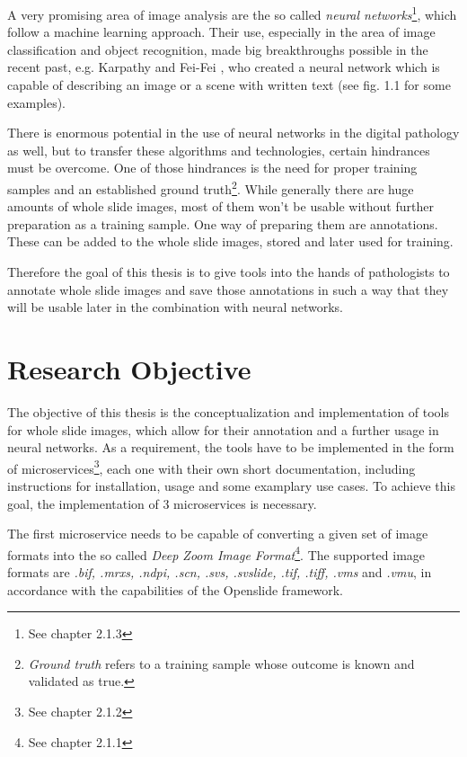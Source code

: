 A very promising area of image analysis are the so called \emph{neural networks}\footnote{See chapter 2.1.3}, which follow a machine learning approach. Their use, especially in the area of image classification and object recognition, made big breakthroughs possible in the recent past, e.g. Karpathy and Fei-Fei \cite{Karpathy15}, who created a neural network which is capable of describing an image or a scene with written text (see fig. 1.1 for some examples).

There is enormous potential in the use of neural networks in the digital pathology as well, but to transfer these algorithms and technologies, certain hindrances must be overcome. One of those hindrances is the need for proper training samples and an established ground truth\footnote{\emph{Ground truth} refers to a training sample whose outcome is known and validated as true.}. While generally there are huge amounts of whole slide images, most of them won't be usable without further preparation as a training sample. One way of preparing them are annotations. These can be added to the whole slide images, stored and later used for training.

Therefore the goal of this thesis is to give tools into the hands of pathologists to annotate whole slide images and save those annotations in such a way that they will be usable later in the combination with neural networks.


\section{Research Objective}

The objective of this thesis is the conceptualization and implementation of tools for whole slide images, which allow for their annotation and a further usage in neural networks.
As a requirement, the tools have to be implemented in the form of microservices\footnote{See chapter 2.1.2}, each one with their own short documentation, including instructions for installation, usage and some examplary use cases. To achieve this goal, the implementation of 3 microservices is necessary.

The first microservice needs to be capable of converting a given set of image formats into the so called \emph{Deep Zoom Image Format}\footnote{See chapter 2.1.1}. The supported image formats are \emph{.bif, .mrxs, .ndpi, .scn, .svs, .svslide, .tif, .tiff, .vms} and \emph{.vmu}, in accordance with the capabilities of the Openslide framework\cite{Goode13}.

